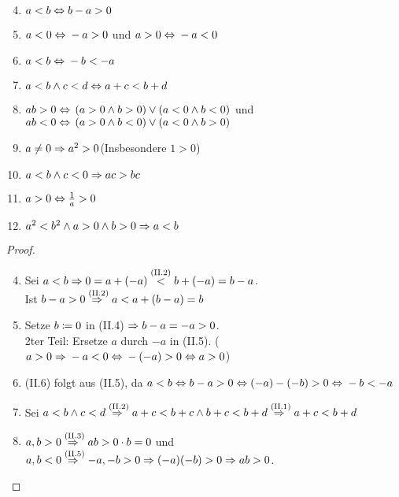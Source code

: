 
\begin{satz}
    \marginnote{[7. Nov]}
    \theoremescape
    \begin{enumerate}[label=(II.\arabic*)]
        \setcounter{enumi}{3}
        \item $a<b\equivalent b-a > 0$
        \item $a<0\equivalent -a > 0$ und $a>0\equivalent -a < 0$
        \item $a<b\equivalent -b < -a$
        \item $a<b \land c < d \equivalent a+c<b+d$
        \item $ab > 0 \equivalent \pair{a>0 \land b > 0}\lor\pair{a < 0 \land b < 0}$ und $ab < 0 \equivalent \pair{a>0 \land b < 0}\lor\pair{a < 0 \land b > 0}$
        \item $a\neq 0 \impl a^2 > 0$\quad(Insbesondere $1>0$)
        \item $a<b \land c<0 \impl ac > bc$
        \item $a>0 \equivalent \frac{1}{a}>0$
        \item $a^2 < b^2 \land a > 0 \land b > 0 \impl a < b$
    \end{enumerate}
    \newpage
    \begin{proof}
        \theoremescape
        \begin{enumerate}[label=(II.\arabic*)]
            \setcounter{enumi}{3}
            \item Sei $a<b \impl 0=a+(-a) \annot{<}{(II.2)} b + (-a) = b-a$.\\
            Ist $b-a>0 \annot{\impl}{(II.2)} a<a+(b-a)=b$
            \item Setze $b\definedas 0$ in (II.4) $\impl b-a=-a>0$.\\
            2ter Teil: Ersetze $a$ durch $-a$ in (II.5). ($a>0 \impl -a < 0 \equivalent -(-a)>0 \equivalent a >0$)
            \item (II.6) folgt aus (II.5), da $a<b\equivalent b-a>0 \equivalent (-a)-(-b) > 0\equivalent -b < -a$
            \item Sei $a<b \land c < d \annot{\impl}{(II.2)} a + c < b + c \land b + c < b + d \annot{\impl}{(II.1)} a+c < b + d$
            \item $a,b>0 \annot{\impl}{(II.3)} ab > 0\cdot b = 0$ und $a,b<0 \annot{\impl}{(II.5)} -a,-b>0 \impl (-a)(-b) > 0 \impl ab > 0$.\\

\end{enumerate}
\end{proof}
\end{satz}
